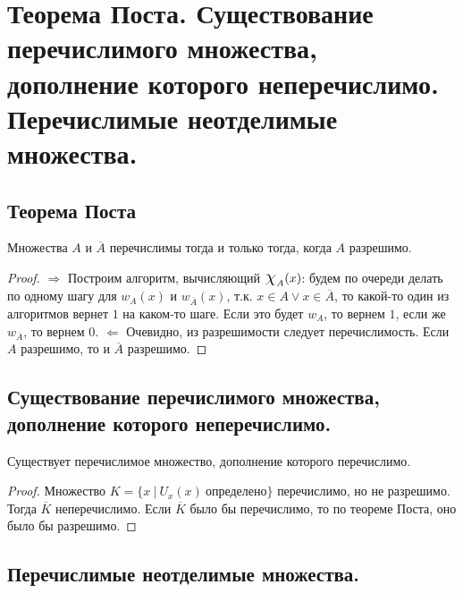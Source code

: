 \section{Теорема Поста. Существование перечислимого множества, дополнение которого неперечислимо. Перечислимые неотделимые множества.}

\subsection{Теорема Поста}

\begin{theorem}
  Множества $A$ и $\overline{A}$ перечислимы тогда и только тогда, когда $A$ разрешимо.
  \begin{proof}
    $\Rightarrow$ \newline
    Построим алгоритм, вычисляющий $\mbox{\Large$\chi$}_A(x)$: будем по очереди делать по одному шагу для $w_A(x)$ и $w_{\overline{A}}(x)$, т.к. $x \in A \vee x \in \overline{A}$, то какой-то один из алгоритмов вернет $1$ на каком-то шаге. Если это будет $w_A$, то вернем $1$, если же $w_{\overline{A}}$, то вернем $0$. \newline
    $\Leftarrow$ \newline
    Очевидно, из разрешимости следует перечислимость. Если $A$ разрешимо, то и $\overline{A}$ разрешимо.
  \end{proof}
\end{theorem}

\subsection{Существование перечислимого множества, дополнение которого неперечислимо.}

\begin{statement}
  Существует перечислимое множество, дополнение которого перечислимо.
  \begin{proof}
    Множество $K = \{x \> | \> U_x(x) \> \textit{определено}\}$ перечислимо, но не разрешимо. Тогда $\overline{K}$ неперечислимо. Если $\overline{K}$ было бы перечислимо, то по теореме Поста, оно было бы разрешимо.
  \end{proof}
\end{statement}


\subsection{Перечислимые неотделимые множества.}

